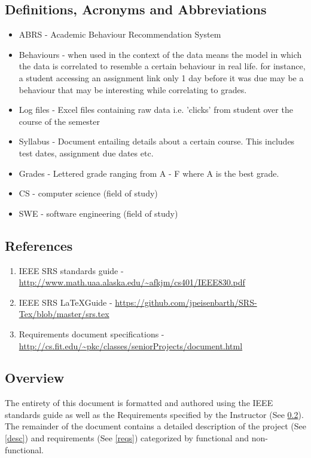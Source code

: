 \documentclass[12pt]{article}
\begin{document}
	\subsection{Definitions, Acronyms and Abbreviations} \label{defs}
	\begin{itemize}
		\item ABRS - Academic Behaviour Recommendation System
		\item Behaviours - when used in the context of the data means the model in which the data is correlated to resemble a certain behaviour in real life. for instance, a student accessing an assignment link only 1 day before it was due may be a behaviour that may be interesting while correlating to grades. 
		\item Log files - Excel files containing raw data i.e. 'clicks' from student over the course of the semester
		\item Syllabus - Document entailing details about a certain course. This includes test dates, assignment due dates etc.
		\item Grades - Lettered grade ranging from A - F where A is the best grade.
		\item CS - computer science (field of study)
		\item SWE - software engineering (field of study)
	\end{itemize}
	\subsection{References} \label{refs}
		\begin{enumerate}
		\item IEEE SRS standards guide -  \url{http://www.math.uaa.alaska.edu/~afkjm/cs401/IEEE830.pdf}
		\item IEEE SRS \LaTeX Guide - \url{https://github.com/jpeisenbarth/SRS-Tex/blob/master/srs.tex}
		\item Requirements document specifications - \url{http://cs.fit.edu/~pkc/classes/seniorProjects/document.html}
	\end{enumerate}
	\subsection{Overview} \label{overview}
	The entirety of this document is formatted and authored using the IEEE standards guide as well as the Requirements specified by the Instructor (See \ref{refs}). The remainder of the document contains a detailed description of the project (See \ref{desc}) and requirements (See \ref{reqs}) categorized by functional and non-functional. 
\end{document}

